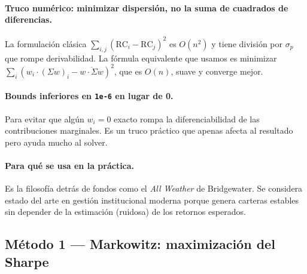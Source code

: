\documentclass[11pt,a4paper]{book}
\begin{document}
\paragraph{Truco numérico: minimizar dispersión, no la suma de cuadrados de diferencias.} La formulación clásica $\sum_{i,j} (\mathrm{RC}_i - \mathrm{RC}_j)^2$ es $O(n^2)$ y tiene división por $\sigma_p$ que rompe derivabilidad. La fórmula equivalente que usamos es minimizar $\sum_i (w_i \cdot (\Sigma w)_i - \overline{w \cdot \Sigma w})^2$, que es $O(n)$, suave y converge mejor.

\paragraph{Bounds inferiores en \texttt{1e-6} en lugar de 0.} Para evitar que algún $w_i = 0$ exacto rompa la diferenciabilidad de las contribuciones marginales. Es un truco práctico que apenas afecta al resultado pero ayuda mucho al solver.

\paragraph{Para qué se usa en la práctica.} Es la filosofía detrás de fondos como el \textit{All Weather} de Bridgewater. Se considera estado del arte en gestión institucional moderna porque genera carteras estables sin depender de la estimación (ruidosa) de los retornos esperados.

\subsection{Método 1 --- Markowitz: maximización del Sharpe}
\end{document}
